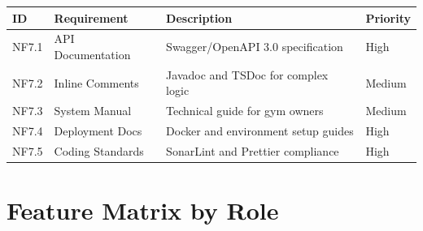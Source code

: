 \documentclass[
  12pt,
  a4paperpaper,
]{report}
\newcounter{none} %
\begin{document}
{\def\LTcaptype{none} %
\begin{longtable}[]{@{}
  >{\raggedright\arraybackslash}p{}
  >{\raggedright\arraybackslash}p{}
  >{\raggedright\arraybackslash}p{}
  >{\raggedright\arraybackslash}p{}@{}}
\hline
ID & Requirement & Description & Priority \\
\hline
\endhead
\hline
\endlastfoot
NF7.1 & API Documentation & Swagger/OpenAPI 3.0 specification & High \\
NF7.2 & Inline Comments & Javadoc and TSDoc for complex logic & Medium \\
NF7.3 & System Manual & Technical guide for gym owners & Medium \\
NF7.4 & Deployment Docs & Docker and environment setup guides & High \\
NF7.5 & Coding Standards & SonarLint and Prettier compliance & High \\
\end{longtable}
}


\section{Feature Matrix by Role}\label{feature-matrix-by-role}
\end{document}
